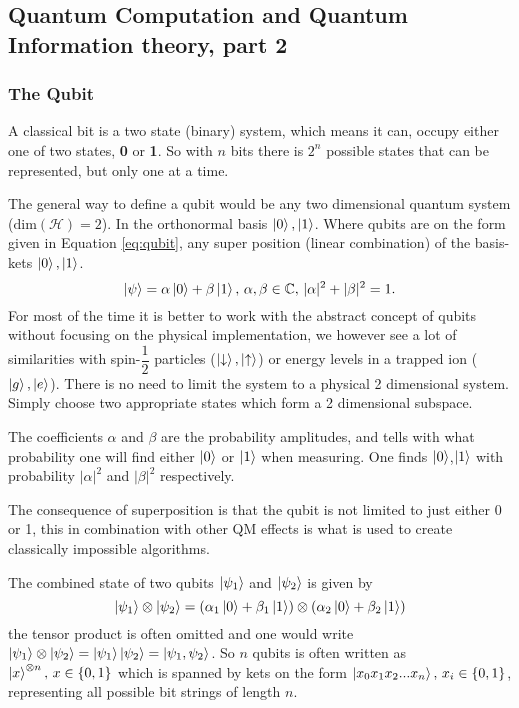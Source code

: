\subsection{Quantum Computation and Quantum Information theory, part 2}

\subsubsection{The Qubit}
A classical bit is a two state (binary) system, which means it can, occupy either one of two states, \textbf{0} or \textbf{1}. So with $n$ bits there is $2^n$ possible states that can be represented, but only one at a time.

The general way to define a qubit would be any two dimensional quantum system ($\text{dim}(\mathcal{H}) = 2$). In the orthonormal basis ${\ket{0},\ket{1}}$. Where qubits are on the form given in Equation \ref{eq:qubit}, any super position (linear combination) of the basis-kets $\ket{0},\ket{1}$.
\begin{equation}
\label{eq:qubit}
\ket{\psi} = \alpha\ket{0} + \beta\ket{1},\,\alpha,\beta \in \mathbb{C},\, |\alpha|^2 + |\beta|^2 = 1.
\end{equation}
For most of the time it is better to work with the abstract concept of qubits without focusing on the physical implementation, we however see a lot of similarities with spin-$\dfrac{1}{2}$ particles ($\ket{\downarrow},\ket{\uparrow}$) or energy levels in a trapped ion ($\ket{g},\ket{e}$). There is no need to limit the system to a physical 2 dimensional system. Simply choose two appropriate states which form a 2 dimensional subspace.

The coefficients $\alpha$ and $\beta$ are the probability amplitudes, and tells with what probability one will find either $\ket{0}$ or $\ket{1}$ when measuring. One finds $\ket{0}$,$\ket{1}$ with probability $|\alpha|^2$ and $|\beta|^2$ respectively.

The consequence of superposition is that the qubit is not limited to just either 0 or 1, this in combination with other QM effects is what is used to create classically impossible algorithms\cite{shor}\cite{Grover}.

The combined state of two qubits $\ket{\psi_1}$ and $\ket{\psi_2}$ is given by 
\begin{equation}
\ket{\psi_1} \otimes \ket{\psi_2} = (\alpha_1\ket{0} + \beta_1\ket{1})\otimes(\alpha_2\ket{0} + \beta_2\ket{1})
\end{equation}
the tensor product is often omitted and one would write $\ket{\psi_1} \otimes \ket{\psi_2} = \ket{\psi_1}\ket{\psi_2} = \ket{\psi_1, \psi_2}$.
So $n$ qubits is often written as $\ket{x}^{\otimes n},\, x \in \{0,1\}$ which is spanned by kets on the form $\ket{x_0x_1x_2...x_n},\, x_i \in \{0,1\}$, representing all possible bit strings of length $n$.

